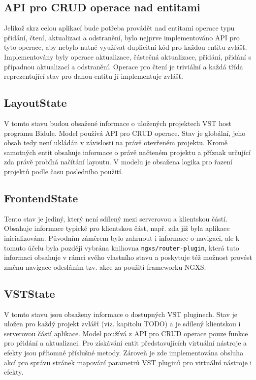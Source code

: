 \documentclass[thesis=M,czech]{FITthesis}[2019/03/06]
\begin{document}
		\subsection{API pro CRUD operace nad entitami}
			Jelikož skrz celou aplikací bude potřeba provádět nad entitami operace typu přidání, čtení, aktualizaci a odstranění, bylo nejprve implementováno API pro tyto operace, aby nebylo nutné využívat duplicitní
			kód pro každou entitu zvlášť. Implementovány byly operace aktualizace, částečná aktualizace, přidání,
			přidání s případnou aktualizací a odstranění. Operace pro čtení je triviální a každá třída reprezentující
			stav pro danou entitu jí implementuje zvlášť.						
		
		\subsection{LayoutState}
			V tomto stavu budou obsažené informace o uložených projektech VST host programu Bidule.
			Model používá API pro CRUD operace. Stav je globální, jeho obsah tedy není ukládán
			v závislosti na právě otevřeném projektu. Kromě samotných entit obsahuje informace o 
			právě načteném projektu a příznak určující zda právě probíhá načítání layoutu.
			V modelu je obsažena logika pro řazení projektů podle času posledního použití.			
			
		\subsection{FrontendState}
			Tento stav je jediný, který není sdílený mezi serverovou a klientskou částí.
			Obsahuje informace typické pro klientskou část, např. zda již byla aplikace inicializována.
			Původním záměrem bylo zahrnout i informace o navigaci, ale k tomuto
			účelu byla později vybrána knihovna \texttt{ngxs/router-plugin}, která tuto informaci
			obsahuje v rámci svého vlastního stavu a poskytuje též možnost provést změnu navigace
			odesláním tzv. akce za použití frameworku NGXS.
		
		\subsection{VSTState}
			V tomto stavu jsou obsaženy informace o dostupných VST pluginech. Stav je uložen 
			pro každý projekt zvlášť (viz. kapitolu TODO) a je sdílený klientskou i serverovou částí aplikace.
			Model používá z API pro CRUD operace pouze funkce pro přidání a aktualizaci.
			Pro získávání entit představujících virtuální nástroje a efekty jsou přítomné příslušné metody.
			Zároveň je zde implementována obsluha akcí pro správu stránek mapování parametrů
			VST pluginů pro virtuální nástroje i efekty.
					
\end{document}
